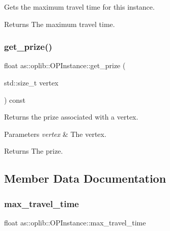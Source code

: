 Gets the maximum travel time for this instance. 

\begin{DoxyReturn}{Returns}
The maximum travel time. 
\end{DoxyReturn}
\mbox{\label{classas_1_1oplib_1_1OPInstance_a7e641c06d51b916cdf6ae88a4510ee0b}} 
\subsubsection{\texorpdfstring{get\+\_\+prize()}{get\_prize()}}
{\footnotesize\ttfamily float as\+::oplib\+::\+O\+P\+Instance\+::get\+\_\+prize (\begin{DoxyParamCaption}\item[{std\+::size\+\_\+t}]{vertex }\end{DoxyParamCaption}) const\hspace{0.3cm}{\ttfamily [inline]}}



Returns the prize associated with a vertex. 


\begin{DoxyParams}{Parameters}
{\em vertex} & The vertex. \\
\hline
\end{DoxyParams}
\begin{DoxyReturn}{Returns}
The prize. 
\end{DoxyReturn}


\subsection{Member Data Documentation}
\mbox{\label{classas_1_1oplib_1_1OPInstance_a57be40043f2881e6ba41d62ad6bd223c}} 
\subsubsection{\texorpdfstring{max\+\_\+travel\+\_\+time}{max\_travel\_time}}
{\footnotesize\ttfamily float as\+::oplib\+::\+O\+P\+Instance\+::max\+\_\+travel\+\_\+time\hspace{0.3cm}{\ttfamily [protected]}}



